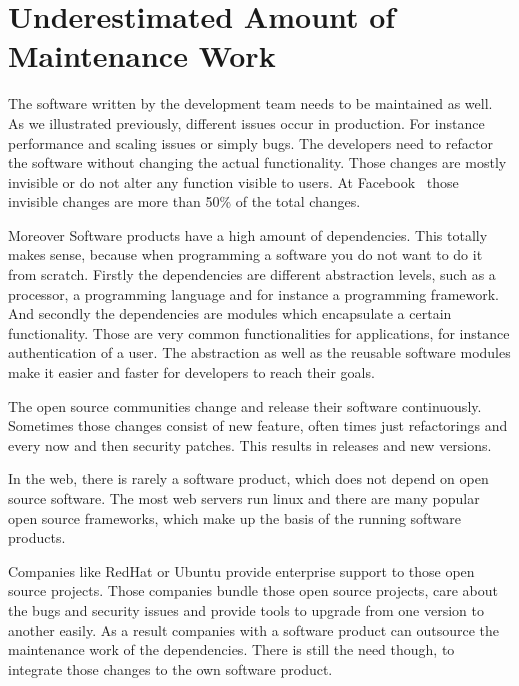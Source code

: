 \section{Underestimated Amount of Maintenance Work}

The software written by the development team needs to be maintained as well. As we
illustrated previously, different issues occur in production. For instance performance and
scaling issues or simply bugs. The developers need to refactor the software without
changing the actual functionality. Those changes are mostly invisible or do not alter any
function visible to users. At Facebook~\cite{dev_at_fb} those invisible changes are more
than 50\% of the total changes.

Moreover Software products have a high amount of dependencies. This totally makes sense,
because when programming a software you do not want to do it from scratch. Firstly the
dependencies are different abstraction levels, such as a processor, a programming language
and for instance a programming framework. And secondly the dependencies are modules which
encapsulate a certain functionality. Those are very common functionalities for
applications, for instance authentication of a user. The abstraction as well as the
reusable software modules make it easier and faster for developers to reach their goals.

The open source communities change and release their software continuously. Sometimes
those changes consist of new feature, often times just refactorings and every now and then
security patches. This results in releases and new versions.

In the web, there is rarely a software product, which does not depend on open source
software. The most web servers run linux and there are many popular open source
frameworks, which make up the basis of the running software products.

Companies like RedHat or Ubuntu provide enterprise support to those open source
projects. Those companies bundle those open source projects, care about the bugs and
security issues and provide tools to upgrade from one version to another easily. As a
result companies with a software product can outsource the maintenance work of the
dependencies. There is still the need though, to integrate those changes to the own
software product.

